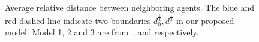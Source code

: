 \begin{figure}[H]
  \centering
  \quad
  \caption{Average relative distance between neighboring agents. The blue and red dashed line indicate two boundaries $d_0^{\frac{1}{2}}, d_1^{\frac{1}{2}}$ in our proposed model. Model 1, 2 and 3 are from~\cite{Vicsek1995},\cite{CuckerSmale2007} and \cite{CuckerDong2010} respectively.}\label{fig:N_dis}
\end{figure}


